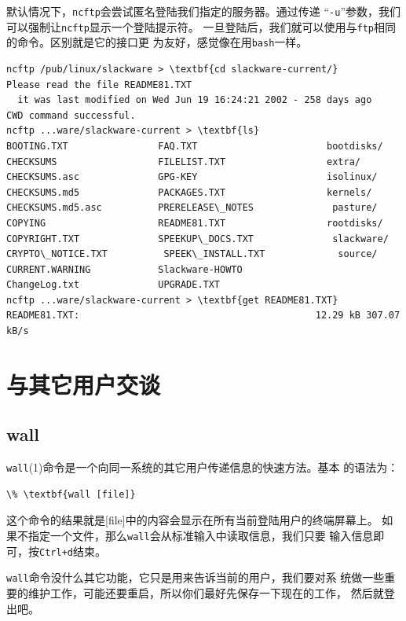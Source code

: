 默认情况下，\texttt{ncftp}会尝试匿名登陆我们指定的服务器。通过传递
``\texttt{-u}''参数，我们可以强制让\texttt{ncftp}显示一个登陆提示符。
一旦登陆后，我们就可以使用与\texttt{ftp}相同的命令。区别就是它的接口更
为友好，感觉像在用\texttt{bash}一样。
\begin{Verbatim}[frame=single, commandchars=\\\{\}]
ncftp /pub/linux/slackware > \textbf{cd slackware-current/}
Please read the file README81.TXT
  it was last modified on Wed Jun 19 16:24:21 2002 - 258 days ago
CWD command successful.
ncftp ...ware/slackware-current > \textbf{ls}
BOOTING.TXT                FAQ.TXT                       bootdisks/
CHECKSUMS                  FILELIST.TXT                  extra/
CHECKSUMS.asc              GPG-KEY                       isolinux/
CHECKSUMS.md5              PACKAGES.TXT                  kernels/
CHECKSUMS.md5.asc          PRERELEASE\_NOTES              pasture/
COPYING                    README81.TXT                  rootdisks/
COPYRIGHT.TXT              SPEEKUP\_DOCS.TXT              slackware/
CRYPTO\_NOTICE.TXT          SPEEK\_INSTALL.TXT             source/
CURRENT.WARNING            Slackware-HOWTO 
ChangeLog.txt              UPGRADE.TXT
ncftp ...ware/slackware-current > \textbf{get README81.TXT}
README81.TXT:                                          12.29 kB 307.07 kB/s
\end{Verbatim}


\section{与其它用户交谈}
\label{chap:basicNetworkCommands:talk}

\subsection{wall}
\label{chap:basicNetworkCommands:talk:wall}
\texttt{wall}(1)命令是一个向同一系统的其它用户传递信息的快速方法。基本
的语法为：
\begin{Verbatim}[frame=single, commandchars=\\\{\}]
\% \textbf{wall [file]}
\end{Verbatim}

这个命令的结果就是[file]中的内容会显示在所有当前登陆用户的终端屏幕上。
如果不指定一个文件，那么\texttt{wall}会从标准输入中读取信息，我们只要
输入信息即可，按\texttt{Ctrl+d}结束。

\texttt{wall}命令没什么其它功能，它只是用来告诉当前的用户，我们要对系
统做一些重要的维护工作，可能还要重启，所以你们最好先保存一下现在的工作，
然后就登出吧。


